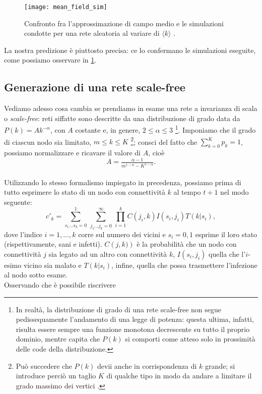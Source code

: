 \begin{figure}[t]
		\begin{center}
			\texttt{[image: mean\_field\_sim]}
			\caption{Confronto fra l'approssimazione di campo medio e le simulazioni condotte per una rete aleatoria al variare di $ \langle k \rangle $ \cite{Bagnoli2014} .}
			\label{fig:sim}
		\end{center}
\end{figure}
La nostra predizione è piuttosto precisa: ce lo confermano le simulazioni eseguite, come possiamo osservare in \cref{fig:sim}.

\subsection{Generazione di una rete scale-free}
Vediamo adesso cosa cambia se prendiamo in esame una rete a invarianza di scala o \emph{scale-free}: reti siffatte sono descritte da una distribuzione di grado data da $ P\left(k\right) = A k^{-\alpha} $, con $ A $ costante e, in genere, $ 2 \leq \alpha \leq 3 $ \footnote{In realtà, la distribuzione di grado di una rete scale-free non segue pedissequamente l'andamento di una legge di potenza: questa ultima, infatti, risulta essere sempre una funzione monotona decrescente su tutto il proprio dominio, mentre capita che $ P\left(k\right) $ si comporti come atteso solo in prossimità delle code della distribuzione.}. 
Imponiamo che il grado di ciascun nodo sia limitato, $ m \leq k \leq K $ \footnote{Può succedere che $ P\left(k\right)$ devii anche in corrispondenza di $ k $ grande; si introduce perciò un taglio $ K $ di qualche tipo in modo da andare a limitare il grado massimo dei vertici \cite{Newman}.}; 
consci del fatto che $ \sum_{k = 0}^K p_k = 1 $, possiamo normalizzare e ricavare il valore di $ A $, cioè 
\[
 A = \tfrac{ \alpha - 1}{m^{1 - \alpha} - K^{1 - \alpha}}.
\]
 \\ Utilizzando lo stesso formalismo impiegato in precedenza, possiamo prima di tutto esprimere lo stato di un nodo con connettività $ k $ al tempo $ t + 1 $ nel modo seguente:
\begin{equation}
	c'_k = \sum_{s_1 \dots s_k = 0}^1 \, \sum_{j_1 \dots j_k = 0}^ \infty \, \prod_{i = 1}^k C\left(j_i,k\right) I\left(s_i, j_i\right) T\left(k|s_i\right),
\end{equation}
dove l'indice $ i = 1, \dots, k $ corre sul numero dei vicini e $ s_i = 0, 1 $ esprime il loro stato (rispettivamente, sani e infetti). $ C\left(j,k)\right) $ è la probabilità che un nodo con connettività $ j $ sia legato ad un altro con connettività $ k $, $ I\left(s_i, j_i\right) $ quella che l'$ i $-esimo vicino sia malato e $ T\left(k|s_i\right) $, infine, quella che possa trasmettere l'infezione al nodo sotto esame. \\ Osservando che è possibile riscrivere
